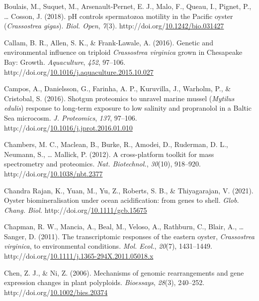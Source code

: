\documentclass [11pt, proquest] {uwthesis}[2015/03/03]
\newlength{\cslhangindent}
\newenvironment{CSLReferences}%
{\setlength{\parindent}{0pt}%
\everypar{\setlength{\hangindent}{\cslhangindent}}\ignorespaces}%
{\par}
\begin{document}
\begin{CSLReferences}{1}{0}
\leavevmode\hypertarget{ref-Boulais2018}{}%
Boulais, M., Suquet, M., Arsenault-Pernet, E. J., Malo, F., Queau, I., Pignet, P., \ldots{} Cosson, J. (2018). {pH controls spermatozoa motility in the Pacific oyster (\emph{Crassostrea gigas})}. \emph{Biol. Open}, \emph{7}(3). http://doi.org/\href{https://doi.org/10.1242/bio.031427}{10.1242/bio.031427}

\leavevmode\hypertarget{ref-Callam2016}{}%
Callam, B. R., Allen, S. K., \& Frank-Lawale, A. (2016). {Genetic and environmental influence on triploid \emph{Crassostrea virginica} grown in Chesapeake Bay: Growth}. \emph{Aquaculture}, \emph{452}, 97--106. http://doi.org/\href{https://doi.org/10.1016/j.aquaculture.2015.10.027}{10.1016/j.aquaculture.2015.10.027}

\leavevmode\hypertarget{ref-Campos2016}{}%
Campos, A., Danielsson, G., Farinha, A. P., Kuruvilla, J., Warholm, P., \& Cristobal, S. (2016). {Shotgun proteomics to unravel marine mussel (\emph{Mytilus edulis}) response to long-term exposure to low salinity and propranolol in a Baltic Sea microcosm}. \emph{J. Proteomics}, \emph{137}, 97--106. http://doi.org/\href{https://doi.org/10.1016/j.jprot.2016.01.010}{10.1016/j.jprot.2016.01.010}

\leavevmode\hypertarget{ref-Chambers2012}{}%
Chambers, M. C., Maclean, B., Burke, R., Amodei, D., Ruderman, D. L., Neumann, S., \ldots{} Mallick, P. (2012). {A cross-platform toolkit for mass spectrometry and proteomics}. \emph{Nat. Biotechnol.}, \emph{30}(10), 918--920. http://doi.org/\href{https://doi.org/10.1038/nbt.2377}{10.1038/nbt.2377}

\leavevmode\hypertarget{ref-ChandraRajan2021}{}%
Chandra Rajan, K., Yuan, M., Yu, Z., Roberts, S. B., \& Thiyagarajan, V. (2021). {Oyster biomineralisation under ocean acidification: from genes to shell}. \emph{Glob. Chang. Biol.} http://doi.org/\href{https://doi.org/10.1111/gcb.15675}{10.1111/gcb.15675}

\leavevmode\hypertarget{ref-Chapman2011}{}%
Chapman, R. W., Mancia, A., Beal, M., Veloso, A., Rathburn, C., Blair, A., \ldots{} Sanger, D. (2011). {The transcriptomic responses of the eastern oyster, \emph{Crassostrea virginica}, to environmental conditions}. \emph{Mol. Ecol.}, \emph{20}(7), 1431--1449. http://doi.org/\href{https://doi.org/10.1111/j.1365-294X.2011.05018.x}{10.1111/j.1365-294X.2011.05018.x}

\leavevmode\hypertarget{ref-Chen2006}{}%
Chen, Z. J., \& Ni, Z. (2006). {Mechanisms of genomic rearrangements and gene expression changes in plant polyploids}. \emph{Bioessays}, \emph{28}(3), 240--252. http://doi.org/\href{https://doi.org/10.1002/bies.20374}{10.1002/bies.20374}


\end{CSLReferences}
\end{document}
